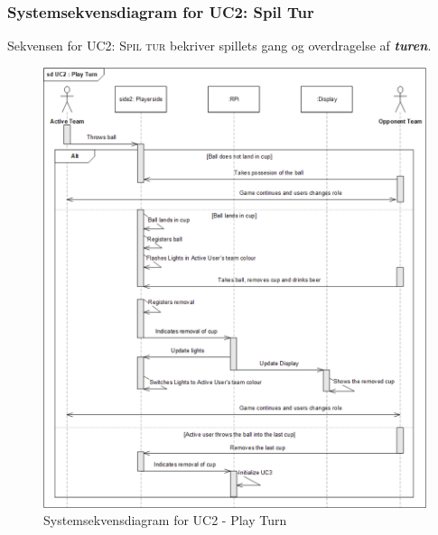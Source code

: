 \documentclass[Rapport/Rapport_main.tex]{subfiles}
\begin{document}
\subsubsection{Systemsekvensdiagram for UC2: Spil Tur}
Sekvensen for \textsc{UC2: Spil tur} bekriver spillets gang og overdragelse af \textit{\textbf{turen}}.
\begin{figure}[H]
    \centering 
    \includegraphics[width=\textwidth]{Arkitektur/Sekvensdiagrammer/graphics/sd_UC2.png}
    \caption{Systemsekvensdiagram for UC2 - Play Turn}
    \label{fig:rap_sd_UC2}
\end{figure}
\end{document}
